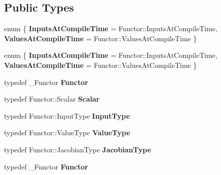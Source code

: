 \subsection*{Public Types}
\begin{DoxyCompactItemize}
\item 
\mbox{\label{class_eigen_1_1_numerical_diff_aa4d700cf5bb0cf52f92c71fff664857b}} 
enum \{ {\bfseries Inputs\+At\+Compile\+Time} = Functor\+:\+:Inputs\+At\+Compile\+Time, 
{\bfseries Values\+At\+Compile\+Time} = Functor\+:\+:Values\+At\+Compile\+Time
 \}
\item 
\mbox{\label{class_eigen_1_1_numerical_diff_a7981fde616a8219d37aa1becbc21d162}} 
enum \{ {\bfseries Inputs\+At\+Compile\+Time} = Functor\+:\+:Inputs\+At\+Compile\+Time, 
{\bfseries Values\+At\+Compile\+Time} = Functor\+:\+:Values\+At\+Compile\+Time
 \}
\item 
\mbox{\label{class_eigen_1_1_numerical_diff_a9c80e89edd7ad2a385d8da74d6f308ef}} 
typedef \+\_\+\+Functor {\bfseries Functor}
\item 
\mbox{\label{class_eigen_1_1_numerical_diff_a0f230ba1d9c016396db42a47c955cac8}} 
typedef Functor\+::\+Scalar {\bfseries Scalar}
\item 
\mbox{\label{class_eigen_1_1_numerical_diff_afc12b27c98f40cee11004ca122e57ed3}} 
typedef Functor\+::\+Input\+Type {\bfseries Input\+Type}
\item 
\mbox{\label{class_eigen_1_1_numerical_diff_a78f0e4dbed51aec35c3ca7d4f0ec49a8}} 
typedef Functor\+::\+Value\+Type {\bfseries Value\+Type}
\item 
\mbox{\label{class_eigen_1_1_numerical_diff_aba79bc99cd5ed368ba9c1877084796aa}} 
typedef Functor\+::\+Jacobian\+Type {\bfseries Jacobian\+Type}
\item 
\mbox{\label{class_eigen_1_1_numerical_diff_a9c80e89edd7ad2a385d8da74d6f308ef}} 
typedef \+\_\+\+Functor {\bfseries Functor}
\item 

\end{DoxyCompactItemize}
